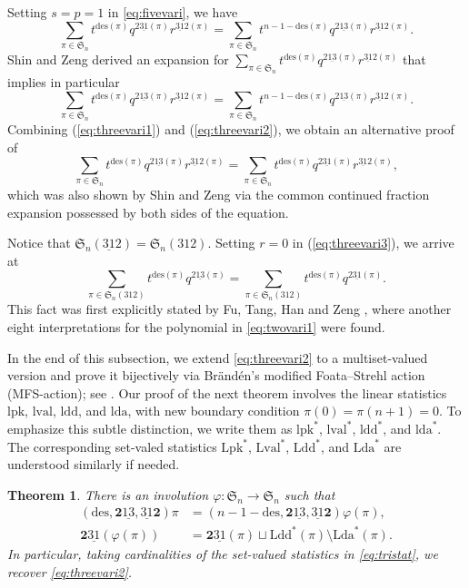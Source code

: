 \documentclass[12pt]{amsart}
\numberwithin{equation}{section}
\theoremstyle{plain}
\newtheorem{theorem}{Theorem}[section]
\theoremstyle{definition}
\def\SS{\mathfrak{S}}
\def\des{\mathrm{des}}
\def\Lpk{\mathrm{Lpk}}
\def\Lval{\mathrm{Lval}}
\def\Lda{\mathrm{Lda}}
\def\Ldd{\mathrm{Ldd}}
\def\lpk{\mathrm{lpk}}
\def\lval{\mathrm{lval}}
\def\lda{\mathrm{lda}}
\def\ldd{\mathrm{ldd}}
\def\pprs{\mathrm{2\underline{13}}}
\def\ppwrs{\mathrm{2\underline{31}}}
\def\pp31-2{\mathrm{\underline{31}2}}
\def\rightascent{{\mathbf{2}\underline{13}}}
\def\leftdescent{\mathrm{\underline{31}}\mathbf{2}}
\def\rightdescent{\mathrm{\mathbf{2}\underline{31}}}
\begin{document}
Setting $s = p = 1$ in \eqref{eq:fivevari}, we have
\begin{equation}\label{eq:threevari1}
  \sum_{\pi \in \SS_n} t^{\des(\pi)}  q^{\ppwrs(\pi)} r^{\pp31-2(\pi)} =
\sum_{\pi \in \SS_n} t^{n-1-\des(\pi)}  q^{\pprs(\pi)} r^{\pp31-2(\pi)}.
\end{equation}
Shin and Zeng \cite[Theorem~2]{SZ12} derived an expansion for $\sum_{\pi \in \SS_n} t^{\des(\pi)}  q^{\pprs(\pi)} r^{\pp31-2(\pi)}$ that implies in particular
\begin{equation}\label{eq:threevari2}
\sum_{\pi \in \SS_n} t^{\des(\pi)}  q^{\pprs(\pi)} r^{\pp31-2(\pi)} = \sum_{\pi \in \SS_n} t^{n-1-\des(\pi)}  q^{\pprs(\pi)} r^{\pp31-2(\pi)}.
\end{equation}
Combining (\ref{eq:threevari1}) and  (\ref{eq:threevari2}),
we obtain an alternative proof of
\begin{equation}\label{eq:threevari3}
  \sum_{\pi \in \SS_n} t^{\des(\pi)}  q^{\pprs(\pi)} r^{\pp31-2(\pi)} =
\sum_{\pi \in \SS_n} t^{\des(\pi)}  q^{\ppwrs(\pi)} r^{\pp31-2(\pi)},
\end{equation}
which was also shown by Shin and Zeng \cite[Eqn.~(39)]{SZ12} via the common continued fraction expansion possessed by both sides of the equation.

Notice that $\SS_n(\pp31-2)=\SS_n(312)$. Setting $r=0$ in (\ref{eq:threevari3}),  we arrive at
\begin{equation}\label{eq:twovari1}
  \sum_{\pi \in \SS_n(312)} t^{\des(\pi)}  q^{\pprs(\pi)}=
\sum_{\pi \in \SS_n(312)} t^{\des(\pi)}  q^{\ppwrs(\pi)}.
\end{equation}
This fact was  first explicitly stated by Fu, Tang, Han and Zeng \cite[Thm.~1.1]{FTHZ}, where another eight interpretations for the polynomial in \eqref{eq:twovari1} were found.

In the end of this subsection, we extend \eqref{eq:threevari2} to a multiset-valued version and prove it bijectively via Br\"and\'en's modified Foata--Strehl action (MFS-action); see \cite{FSt,Bra08,SWG}. Our proof of the next theorem involves the linear statistics $\lpk$, $\lval$, $\ldd$, and $\lda$, with new boundary condition $\pi(0)=\pi(n+1)=0$. To emphasize this subtle distinction, we write them as $\lpk^*$, $\lval^*$, $\ldd^*$, and $\lda^*$. The corresponding set-valed statistics $\Lpk^*$, $\Lval^*$, $\Ldd^*$, and $\Lda^*$ are understood similarly if needed.
\begin{theorem}\label{thm:tristat}
There is an involution
$\varphi: \SS_n \to \SS_n$  such that
\begin{align}
\label{eq:tristat}
  (\des,\rightascent,\leftdescent)\pi &=(n-1-\des,\rightascent,\leftdescent) \varphi(\pi),\\
  \rightdescent(\varphi(\pi)) &= \rightdescent(\pi)\sqcup \Ldd^*(\pi)\setminus\Lda^*(\pi).
\end{align}
In particular, taking cardinalities of the set-valued statistics in \eqref{eq:tristat}, we recover \eqref{eq:threevari2}.
\end{theorem}
\end{document}
